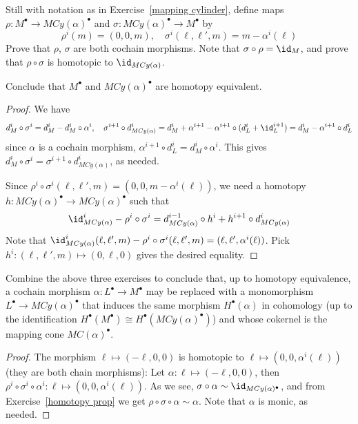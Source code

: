 \begin{exercise}\label{map cyl homotopy equi}
Still with notation as in Exercise~\ref{mapping cylinder}, define maps $\rho:M^\bullet\to MCy(\alpha)^\bullet$
and $\sigma:MCy(\alpha)^\bullet\to M^\bullet$ by
\[\rho^i(m)=(0,0,m),\quad\sigma^i(\ell,\ell',m)=m-\alpha^i(\ell)\]
Prove that $\rho$, $\sigma$ are both cochain morphisms. Note that $\sigma\circ\rho=\id_M$, and prove
that $\rho\circ\sigma$ is homotopic to $\id_{MCy(\alpha)}$.\par
Conclude that $M^\bullet$ and $MCy(\alpha)^\bullet$ are homotopy equivalent.
\end{exercise}
\begin{proof}
We have
\[d_M^i\circ\sigma^i=d_M^i-d_M^i\circ\alpha^i,\quad \sigma^{i+1}\circ d_{MCy(\alpha)}^i=d_M^i+\alpha^{i+1}-\alpha^{i+1}\circ(d_L^i+\id_L^{i+1})=d_M^i-\alpha^{i+1}\circ d_L^i\]
since $\alpha$ is a cochain morphism, $\alpha^{i+1}\circ d_L^i=d_M^i\circ\alpha^i$. This gives $d_M^i\circ\sigma^i=\sigma^{i+1}\circ d_{MCy(\alpha)}^i$, as needed.\par
Since $\rho^i\circ\sigma^i(\ell,\ell',m)=(0,0,m-\alpha^i(\ell))$, we need a homotopy $h:MCy(\alpha)^\bullet\to MCy(\alpha)^\bullet$ such that
\[\id_{MCy(\alpha)}^i-\rho^i\circ\sigma^i=d_{MCy(\alpha)}^{i-1}\circ h^i+h^{i+1}\circ d_{MCy(\alpha)}^{i}\]
Note that $\id_{MCy(\alpha)}^i(\ell,\ell',m)-\rho^i\circ\sigma^i(\ell,\ell',m)=(\ell,\ell',\alpha^i(\ell))$. Pick $h^i:(\ell,\ell',m)\mapsto(0,\ell,0)$ gives the desired equality.
\end{proof}
\begin{exercise}
Combine the above three exercises to conclude that, up to homotopy equivalence, a cochain morphism $\alpha:L^\bullet\to M^\bullet$ may be replaced with a monomorphism $L^\bullet\to MCy(\alpha)^\bullet$ that induces the same morphism $H^\bullet(\alpha)$ in cohomology (up to the identification $H^\bullet(M^\bullet)\cong H^\bullet(MCy(\alpha)^\bullet)$) and whose cokernel is the mapping cone $MC(\alpha)^\bullet$.
\end{exercise}
\begin{proof}
The morphism $\ell\mapsto(-\ell,0,0)$ is homotopic to $\ell\mapsto(0,0,\alpha^i(\ell))$ (they are both chain morphisms): Let $\alpha:\ell\mapsto(-\ell,0,0)$, then $\rho^i\circ\sigma^i\circ\alpha^i:\ell\mapsto(0,0,\alpha^i(\ell))$. As we see, $\sigma\circ\alpha\sim \id_{MCy(\alpha)^\bullet}$, and from Exercise~\ref{homotopy prop} we get $\rho\circ\sigma\circ\alpha\sim\alpha$. Note that $\alpha$ is monic, as needed.
\end{proof}
